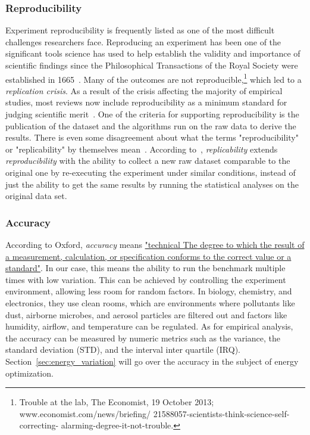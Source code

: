 \subsubsection{Reproducibility}\label{subsec:soa_reproducibility}

Experiment reproducibility is frequently listed as one of the most difficult challenges researchers face.
Reproducing an experiment has been one of the significant tools science has used to help establish the validity and importance of scientific findings since the Philosophical Transactions of the Royal Society were established in 1665~\cite{hankins1986debate}.
Many of the outcomes are not reproducible,\footnote{Trouble at the lab, The Economist, 19 October 2013;  www.economist.com/news/briefing/ 21588057-scientists-think-science-self-correcting- alarming-degree-it-not-trouble.} which led to a \emph{replication crisis}.
As a result of the crisis affecting the majority of empirical studies, most reviews now include reproducibility as a minimum standard for judging scientific merit~\cite{peng2011reproducible}.
One of the criteria for supporting reproducibility is the publication of the dataset and the algorithms run on the raw data to derive the results.
There is even some disagreement about what the terms "reproducibility" or "replicability" by themselves mean~\cite{goodman2016does}.
According to~\cite{echtler2018open}, \emph{replicability} extends \emph{reproducibility} with the ability to collect a new raw dataset comparable to the original one by re-executing the experiment under similar conditions, instead of just the ability to get the same results by running the statistical analyses on the original data set.


\subsubsection{Accuracy}
According to Oxford, \emph{accuracy} means \href{https://www.lexico.com/definition/accuracy}{"technical The degree to which the result of a measurement, calculation, or specification conforms to the correct value or a standard"}.
In our case, this means the ability to run the benchmark multiple times with low variation. This can be achieved by controlling the experiment environment, allowing less room for random factors.
In biology, chemistry, and electronics, they use clean rooms, which are environments where pollutants like dust, airborne microbes, and aerosol particles are filtered out and factors like humidity, airflow, and temperature can be regulated. As for empirical analysis, the accuracy can be measured by numeric metrics such as the variance, the standard deviation (STD), and the interval inter quartile (IRQ).
Section~\ref{sec:energy_variation} will go over the accuracy in the subject of energy optimization.

